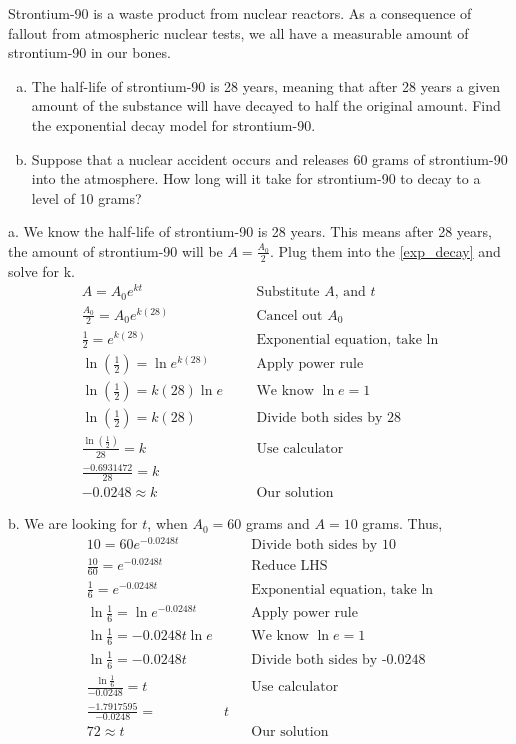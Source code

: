 \begin{exa}
Strontium-90 is a waste product from nuclear reactors. As a consequence of fallout from 
atmospheric nuclear tests, we all have a measurable amount of strontium-90 in our bones.
	\begin{enumerate}[a.]
		\item The half-life of strontium-90 is 28 years, meaning that after 28 years a given amount of the substance will have decayed to half the original amount. Find the exponential decay model for strontium-90. 
		\item Suppose that a nuclear accident occurs and releases 60 grams of strontium-90 into the atmosphere. How long will it take for strontium-90 to decay to a level of 10 grams?
	\end{enumerate}	
\newpage
a. We know the half-life of strontium-90 is 28 years. This means after 28 years, the
amount of strontium-90 will be $A=\frac{A_0}{2}$. Plug them into the \eqref{exp_decay} 
and solve for k. 
		\begin{align*}
			A = A_0e^{kt}& &&\text{Substitute $A$, and $t$}\\
			\frac{A_0}{2} = A_0e^{k(28)}& &&\text{Cancel out $A_0$}\\
			\frac{1}{2} = e^{k(28)}& &&\text{Exponential equation, take ln}\\
			\ln{\left(\frac{1}{2}\right)}= \ln{e^{k(28)}}& &&\text{Apply power rule}\\
			\ln{\left(\frac{1}{2}\right)}=k(28)\ln{e}& &&\text{We know $\ln{e}=1$}\\
			\ln{\left(\frac{1}{2}\right)}=k(28)& &&\text{Divide both sides by 28}\\
			\frac{\ln{\left(\frac{1}{2}\right)}}{28}=k& &&\text{Use calculator}\\[.2cm]
			\frac{-0.6931472}{28}= k& && \\[.2cm]
			-0.0248 \approx k& && \text{Our solution}	
		\end{align*}
\end{exa}
b. We are looking for $t$, when $A_0=60$ grams and $A=10$ grams. Thus,
		\begin{align*}
			10 = 60e^{-0.0248t}& &&\text{Divide both sides by 10}\\
			\frac{10}{60}= e^{-0.0248t}& &&\text{Reduce LHS }\\
			\frac{1}{6}= e^{-0.0248t}& &&\text{Exponential equation, take ln}\\
			\ln{\frac{1}{6}}= \ln{e^{-0.0248t}}& &&\text{Apply power rule}\\
			\ln{\frac{1}{6}}=-0.0248t\ln{e}& &&\text{We know $\ln{e}=1$}\\
			\ln{\frac{1}{6}}= -0.0248t& &&\text{Divide both sides by -0.0248}\\[.3cm]
			\frac{\ln{\frac{1}{6}}}{-0.0248}=t& &&\text{Use calculator}\\[.3cm]
			\frac{-1.7917595}{-0.0248}=& t && \\[.3cm]
			72 \approx t& && \text{Our solution}	
		\end{align*}